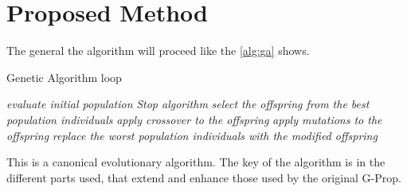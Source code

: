 \documentclass[runningheads]{llncs}
\begin{document}
\section{Proposed Method}
\label{method}

The general the algorithm will proceed like the \autoref{alg:ga} shows.

\begin{algorithm}
  \caption{Genetic Algorithm loop}\label{alg:ga}
  \begin{algorithmic}[1]
    \State \textit{evaluate initial population}
    \State \textit{Stop algorithm}
    \EndIf
    \State \textit{select the offspring from the best population individuals}
    \State \textit{apply crossover to the offspring}
    \State \textit{apply mutations to the offspring}
    \State \textit{replace the worst population individuals with the modified offspring}
    \EndWhile
  \end{algorithmic}
\end{algorithm}

This is a canonical evolutionary algorithm. The key of the algorithm is
in the different parts used, that extend and enhance those used by the
original G-Prop.
\end{document}
